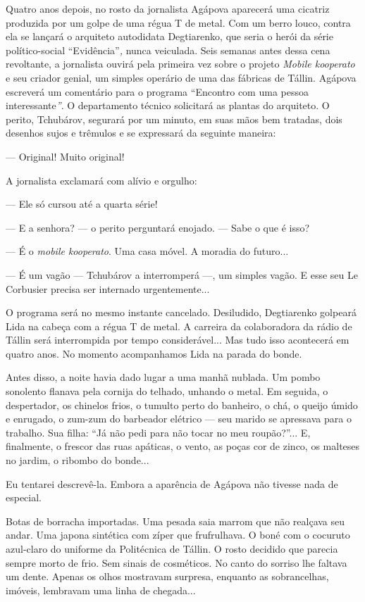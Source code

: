 Quatro anos depois, no rosto da jornalista Agápova aparecerá uma
cicatriz produzida por um golpe de uma régua T de metal. Com um berro
louco, contra ela se lançará o arquiteto autodidata Degtiarenko, que
seria o herói da série político-social ``Evidência''\emph{,} nunca
veiculada. Seis semanas antes dessa cena revoltante, a jornalista ouvirá
pela primeira vez sobre o projeto \emph{Mobile kooperato} e seu criador
genial, um simples operário de uma das fábricas de Tállin. Agápova
escreverá um comentário para o programa ``Encontro com uma pessoa
interessante\emph{''}. O departamento técnico solicitará as plantas do
arquiteto. O perito, Tchubárov, segurará por um minuto, em suas mãos bem
tratadas, dois desenhos sujos e trêmulos e se expressará da seguinte
maneira:

--- Original! Muito original!

A jornalista exclamará com alívio e orgulho:

--- Ele só cursou até a quarta série!

--- E a senhora? --- o perito perguntará enojado. --- Sabe o que é isso?

--- É o \emph{mobile kooperato}. Uma casa móvel. A moradia do futuro...

--- É um vagão --- Tchubárov a interromperá ---, um simples vagão. E
esse seu Le Corbusier precisa ser internado urgentemente...

O programa será no mesmo instante cancelado. Desiludido, Degtiarenko
golpeará Lida na cabeça com a régua T de metal. A carreira da
colaboradora da rádio de Tállin será interrompida por tempo
considerável... Mas tudo isso acontecerá em quatro anos. No momento
acompanhamos Lida na parada do bonde.

Antes disso, a noite havia dado lugar a uma manhã nublada. Um pombo
sonolento flanava pela cornija do telhado, unhando o metal. Em seguida,
o despertador, os chinelos frios, o tumulto perto do banheiro, o chá, o
queijo úmido e enrugado, o zum-zum do barbeador elétrico --- seu marido
se apressava para o trabalho. Sua filha: ``Já não pedi para não tocar no
meu roupão?''... E, finalmente, o frescor das ruas apáticas, o vento, as
poças cor de zinco, os malteses no jardim, o ribombo do bonde...

Eu tentarei descrevê-la. Embora a aparência de Agápova não tivesse nada
de especial.

Botas de borracha importadas. Uma pesada saia marrom que não realçava
seu andar. Uma japona sintética com zíper que frufrulhava. O boné com o
cocuruto azul-claro do uniforme da Politécnica de Tállin. O rosto
decidido que parecia sempre morto de frio. Sem sinais de cosméticos. No
canto do sorriso lhe faltava um dente. Apenas os olhos mostravam
surpresa, enquanto as sobrancelhas, imóveis, lembravam uma linha de
chegada...

